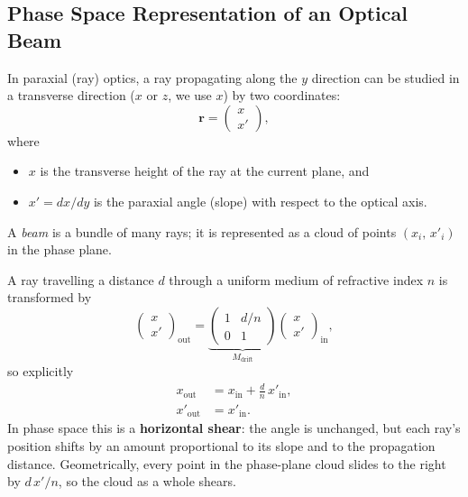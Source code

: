 
\subsection{Phase Space Representation of an Optical Beam}


In paraxial (ray) optics, a ray propagating along the $y$ direction can be studied in a transverse direction ($x$ or $z$, we use $x$) by two coordinates:
\begin{equation}
  \mathbf{r} = \begin{pmatrix} x \\ x' \end{pmatrix},
\end{equation}
where
\begin{itemize}
  \item $x$ is the transverse height of the ray at the current plane, and
  \item $x' = dx/dy$ is the paraxial angle (slope) with respect to the optical axis.
\end{itemize}

A \emph{beam} is a bundle of many rays; it is represented as a cloud of points
$(x_i,\, x'_i)$ in the phase plane.


A ray travelling a distance $d$ through a uniform medium of refractive index $n$
is transformed by
\begin{equation}
  \begin{pmatrix} x \\ x' \end{pmatrix}_{\!\text{out}}
  =
  \underbrace{\begin{pmatrix} 1 & d/n \\ 0 & 1 \end{pmatrix}}_{M_{\text{drift}}}
  \begin{pmatrix} x \\ x' \end{pmatrix}_{\!\text{in}},
\end{equation}
so explicitly
\begin{align}
  x_{\text{out}}  &= x_{\text{in}} + \frac{d}{n}\,x'_{\text{in}}, \\[4pt]
  x'_{\text{out}} &= x'_{\text{in}}.
\end{align}
In phase space this is a \textbf{horizontal shear}: the angle is unchanged, but
each ray's position shifts by an amount proportional to its slope and to the
propagation distance.  Geometrically, every point in the phase-plane cloud slides
to the right by $d\,x'/n$, so the cloud as a whole shears.

